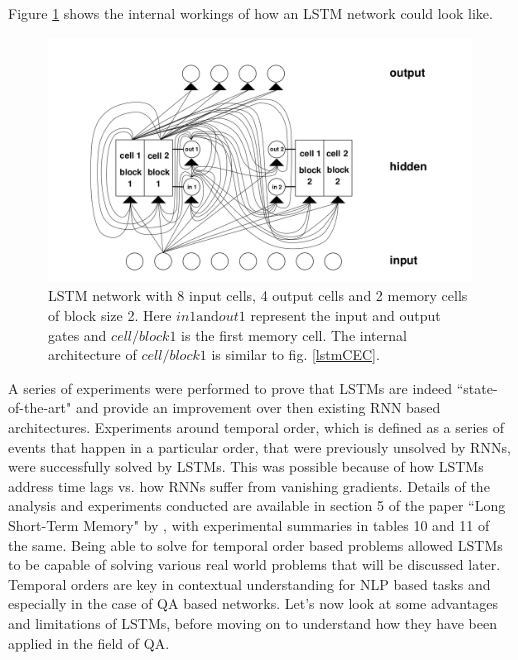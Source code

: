 \documentclass[a4paper,12pt]{report}
\begin{document}
            Figure \ref{lstmNetwork} shows the internal workings of how an LSTM network could look like.
            \begin{figure}[!h]
	           \centering
               \includegraphics[scale=0.35]{../images/lstm-network.png}
      		   \caption{LSTM network with 8 input cells, 4 output cells and 2 memory cells of block size 2. Here $ in1 \text{and} out1 $ represent the input and output gates and $ cell/block1 $ is the first memory cell. The internal architecture of $ cell/block1 $ is similar to fig. \ref{lstmCEC}. \citep{lstmoriginal}}\label{lstmNetwork}
            \end{figure}

            A series of experiments were performed to prove that LSTMs are indeed ``state-of-the-art" and provide an improvement over then existing RNN based architectures.
            Experiments around temporal order, which is defined as a series of events that happen in a particular order, that were previously unsolved by RNNs, were successfully solved by LSTMs. This was possible because of how LSTMs address time lags vs. how RNNs suffer from vanishing gradients. Details of the analysis and experiments conducted are available in section 5 of the paper ``Long Short-Term Memory" by \citep{lstmoriginal}, with experimental summaries in tables 10 and 11 of the same. Being able to solve for temporal order based problems allowed LSTMs to be capable of solving various real world problems that will be discussed later.
            Temporal orders are key in contextual understanding for NLP based tasks and especially in the case of QA based networks. Let's now look at some advantages and limitations of LSTMs, before moving on to understand how they have been applied in the field of QA.
\end{document}
